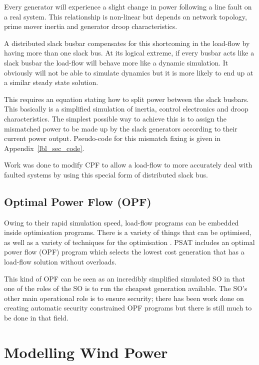 \documentclass[a4paper,oneside,12pt]{report}
\begin{document}
Every generator will experience a slight change in power following a line fault on a real system. This relationship is non-linear but depends on network topology, prime mover inertia and generator droop characteristics.

A distributed slack busbar compensates for this shortcoming in the load-flow by having more than one slack bus. At its logical extreme, if every busbar acts like a slack busbar the load-flow will behave more like a dynamic simulation. It obviously will not be able to simulate dynamics but it is more likely to end up at a similar steady state solution.

This requires an equation stating how to split power between the slack busbars. This basically is a simplified simulation of inertia, control electronics and droop characteristics. The simplest possible way to achieve this is to assign the mismatched power to be made up by the slack generators according to their current power output. Pseudo-code for this mismatch fixing is given in Appendix~\ref{lbl_sec_code}.

Work was done to modify CPF to allow a load-flow to more accurately deal with faulted systems by using this special form of distributed slack bus.

\subsection{Optimal Power Flow (OPF)}

Owing to their rapid simulation speed, load-flow programs can be embedded inside optimisation programs. There is a variety of things that can be optimised, as well as a variety of techniques for the optimisation \cite{Zhang2007}. PSAT includes an optimal power flow (OPF) program which selects the lowest cost generation that has a load-flow solution without overloads.

This kind of OPF can be seen as an incredibly simplified simulated SO in that one of the roles of the SO is to run the cheapest generation available. The SO's other main operational role is to ensure security; there has been work done on creating automatic security constrained OPF programs but there is still much to be done in that field.

\section{Modelling Wind Power}\label{lbl_sec_model_wind}
\end{document}
